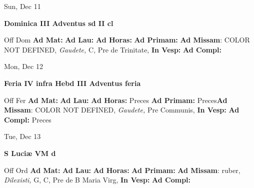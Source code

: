 \documentclass[10pt]{memoir}
\begin{document}
\begin{center}
\begin{minipage}{3.5in}
\vspace{2em}
\begin{center}Sun, Dec 11
\end{center}
\textbf{ \large Dominica III Adventus
\textnormal{\normalsize sd II cl}}

\begin{justify}Off Dom
\textbf{Ad Mat: }
\textbf{Ad Lau: }
\textbf{Ad Horas: }
\textbf{Ad Primam: }\textbf{Ad Missam}: COLOR NOT DEFINED, \textit{Gaudete,} C, Pre de Trinitate, 
\textbf{In Vesp: }
\textbf{Ad Compl: }
\end{justify}
\end{minipage}
\end{center}

\begin{center}
\begin{minipage}{3.5in}
\vspace{2em}
\begin{center}Mon, Dec 12
\end{center}
\textbf{ \large Feria IV infra Hebd III Adventus
\textnormal{\normalsize feria}}

\begin{justify}Off Fer
\textbf{Ad Mat: }
\textbf{Ad Lau: }
\textbf{Ad Horas: }Preces
\textbf{Ad Primam: }Preces\textbf{Ad Missam}: COLOR NOT DEFINED, \textit{Gaudete,} Pre Communis, 
\textbf{In Vesp: }
\textbf{Ad Compl: }Preces
\end{justify}
\end{minipage}
\end{center}

\begin{center}
\begin{minipage}{3.5in}
\vspace{2em}
\begin{center}Tue, Dec 13
\end{center}
\textbf{ \large S Luciæ VM
\textnormal{\normalsize d}}

\begin{justify}Off Ord
\textbf{Ad Mat: }
\textbf{Ad Lau: }
\textbf{Ad Horas: }
\textbf{Ad Primam: }\textbf{Ad Missam}: ruber, \textit{Dilexisti,} G, C, Pre de B Maria Virg, 
\textbf{In Vesp: }
\textbf{Ad Compl: }
\end{justify}
\end{minipage}
\end{center}
\end{document}
